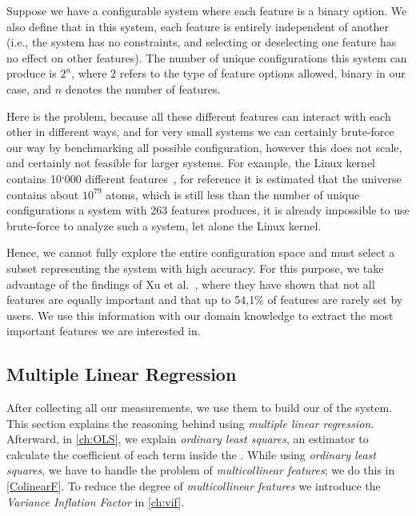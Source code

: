Suppose we have a configurable system where each feature is a binary option.
We also define that in this system, each feature is entirely independent of another
(i.e., the system has no constraints, and selecting or deselecting one feature has no effect on other features).
The number of unique configurations this system can produce is $2^n$, where $2$ refers to the type of feature options allowed,
binary in our case, and $n$ denotes the number of features. 

Here is the problem, because all these different features can interact with each other in different ways, and for very small systems
we can certainly brute-force our way by benchmarking all possible configuration, however this does not scale, and certainly not feasible for 
larger systems. For example, the Linux kernel contains 10`000 different features~\cite{Linux-Kernel}, for reference it is estimated that the universe
contains about $10^{79}$ atoms, which is still less than the number of unique configurations a system with 263 features produces, it is already impossible to use brute-force to analyze
such a system, let alone the Linux kernel.

Hence, we cannot fully explore the entire configuration space and must select a subset representing the system with high accuracy. 
For this purpose, we take advantage of the findings of Xu et al.~\cite{TooManyKnobs}, 
where they have shown that not all features are equally important and that up to 54,1\% of features are rarely set by users. 
We use this information with our domain knowledge to extract the most important features we are interested in.


\subsection{Multiple Linear Regression} \label{ch:linear-regression}
After collecting all our measurements, we use them to build our {\perfInfluenceModel} of the system. 
This section explains the reasoning behind using \emph{multiple linear regression}. 
Afterward, in \autoref{ch:OLS}, we explain \emph{ordinary least squares}, an estimator to calculate the coefficient of each term inside the \perfInfluenceModel. 
While using \emph{ordinary least squares}, we have to handle the problem of \emph{multicollinear features}; we do this in \autoref{ColinearF}. 
To reduce the degree of \emph{multicollinear features} we introduce the \emph{Variance Inflation Factor} in \autoref{ch:vif}.


